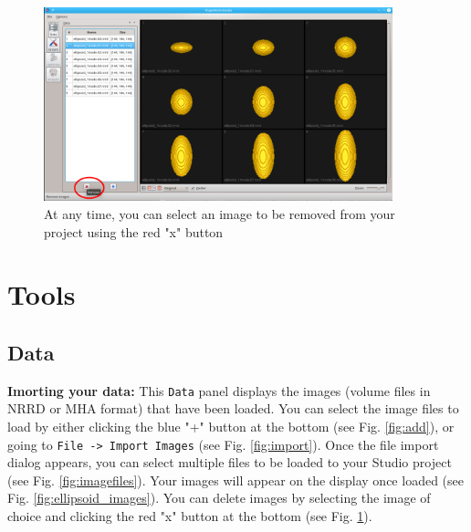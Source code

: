 \documentclass[letterpaper,12pt]{article}   %
\begin{document}
\begin{figure}[!htp]
	\centering
	\includegraphics[width=0.9\textwidth]{figs_v2/remove.png}
	\caption{At any time, you can select an image to be removed from your project using the red "x" button}
	\label{fig:remove}
\end{figure}


\section{Tools}

\subsection{Data}

\noindent\textbf{Imorting your data:} This \texttt{Data} panel displays the images (volume files in NRRD or MHA format) that have been loaded. You can select the image files to load by either clicking the blue "+" button at the bottom (see Fig. \ref{fig:add}), or going to \texttt{File -> Import Images} (see Fig. \ref{fig:import}). Once the file import dialog appears, you can select multiple files to be loaded to your Studio project (see Fig. \ref{fig:imagefiles}). Your images will appear on the display once loaded (see Fig. \ref{fig:ellipsoid_images}). You can delete images by selecting the image of choice and clicking the red "x" button at the bottom (see Fig. \ref{fig:remove}). 
\end{document}
